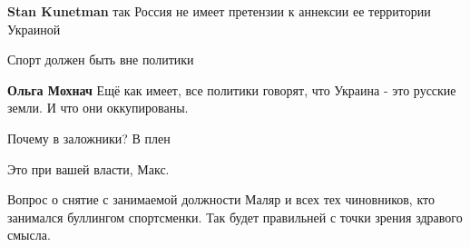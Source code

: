 \begin{itemize}
\begin{itemize}
 
\textbf{Stan Kunetman} так Россия не имеет претензии к аннексии ее территории Украиной

 
Спорт должен быть вне политики

 
\textbf{Ольга Мохнач} Ещё как имеет, все политики говорят, что Украина - это русские земли. И что они оккупированы.
\end{itemize}

 
Почему в заложники? В плен

 
Это при вашей власти, Макс.

 

Вопрос о снятие с занимаемой должности Маляр и всех тех чиновников, кто
занимался буллингом спортсменки. Так будет правильней с точки зрения здравого
смысла.

\begin{itemize}
 

\end{itemize}
\end{itemize}
